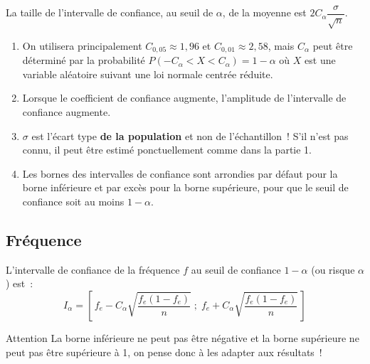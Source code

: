 \documentclass[11pt,a4paper]{article}
\begin{document}
\begin{propriete}
La taille de l'intervalle de confiance, au seuil de $\alpha$, de la moyenne est $2 C_\alpha \dfrac{\sigma}{\sqrt{n}}$.
\end{propriete}

\begin{remarque}
\begin{enumerate}[leftmargin=5mm,itemsep=2pt]
\item On utilisera principalement $C_{0{,}05} \approx 1{,}96$ et $C_{0{,}01} \approx 2{,}58$, mais $C_\alpha$ peut être déterminé par la probabilité $P(-C_\alpha < X < C_\alpha) = 1-\alpha$ où $X$ est une variable aléatoire suivant une loi normale centrée réduite.
\item Lorsque le coefficient de confiance augmente, l'amplitude de l'intervalle de confiance augmente.
\item $\sigma$ est l'écart type \textbf{de la population} et non de l'échantillon~! S'il n'est pas connu, il peut être estimé ponctuellement comme dans la partie 1.
\item Les bornes des intervalles de confiance sont arrondies par défaut pour la borne inférieure et par excès pour la borne supérieure, pour que le seuil de confiance soit au moins $1-\alpha$.
\end{enumerate}
\end{remarque}

\subsection{Fréquence}

\begin{definition}
L'intervalle de confiance de la fréquence $f$ au seuil de confiance $1-\alpha$ (ou risque $\alpha$) est~:
$$I_\alpha = \left[\, f_e - C_\alpha \sqrt{\dfrac{f_e(1-f_e)}{n}} \;;\; f_e + C_\alpha \sqrt{\dfrac{f_e(1-f_e)}{n}} \,\right]$$
\end{definition}

\begin{cadre}[colback=red!5!white,colframe=red]{Attention}
La borne inférieure ne peut pas être négative et la borne supérieure ne peut pas être supérieure à 1, on pense donc à les adapter aux résultats~!
\end{cadre}
\end{document}
